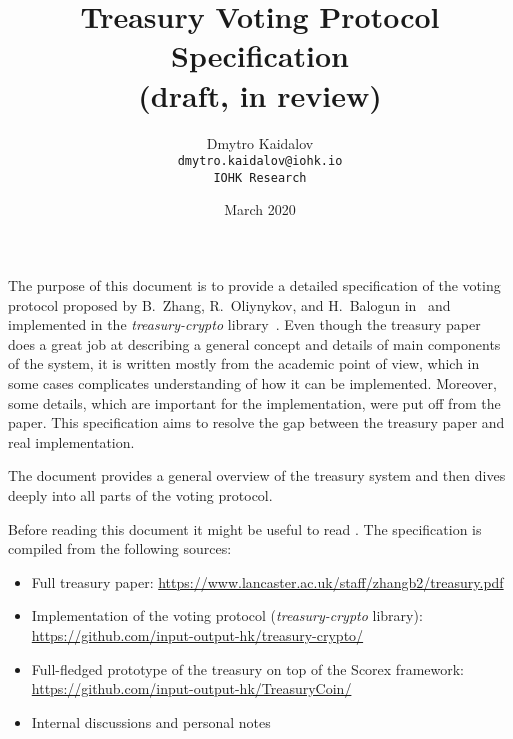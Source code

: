 \documentclass{article}
\title{Treasury Voting Protocol Specification\\
(draft, in review)}
\author{Dmytro Kaidalov\\
    \texttt{dmytro.kaidalov@iohk.io}\\
    \texttt{IOHK Research}}
\date{March 2020}
\begin{document}
\maketitle
\thispagestyle{empty}

The purpose of this document is to provide a detailed specification of the voting protocol proposed by B.~Zhang, R.~Oliynykov, and H.~Balogun in~\cite{ZOB18} and implemented in the \textit{treasury-crypto} library~\cite{treasury-crypto}. Even though the treasury paper~\cite{ZOB18} does a great job at describing a general concept and details of main components of the system, it is written mostly from the academic point of view, which in some cases complicates understanding of how it can be implemented. Moreover, some details, which are important for the implementation, were put off from the paper. This specification aims to resolve the gap between the treasury paper and real implementation.

The document provides a general overview of the treasury system and then dives deeply into all parts of the voting protocol.

Before reading this document it might be useful to read \cite{ZOB18}. 
The specification is compiled from the following sources:
\begin{itemize}
    \item Full treasury paper: \url{https://www.lancaster.ac.uk/staff/zhangb2/treasury.pdf} \cite{ZOB18}
    \item Implementation of the voting protocol (\textit{treasury-crypto} library):\\ \url{https://github.com/input-output-hk/treasury-crypto/} \cite{treasury-crypto}
    \item Full-fledged prototype of the treasury on top of the Scorex framework:\\
    \url{https://github.com/input-output-hk/TreasuryCoin/} \cite{treasurycoin}
    \item Internal discussions and personal notes
\end{itemize}

\newpage
{
  \hypersetup{linkcolor=black}
  \tableofcontents
}





\end{document}
